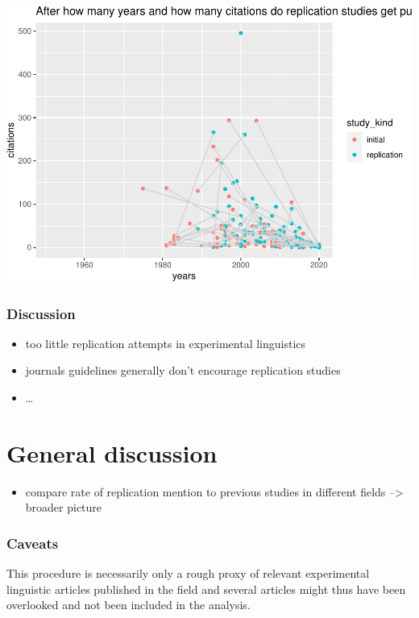 \documentclass[]{elsarticle} %
\providecommand{\tightlist}{%
  \setlength{\itemsep}{0pt}\setlength{\parskip}{0pt}}
\begin{document}
\includegraphics{ReplicationLing_files/figure-latex/plot cit and years all-1.pdf}

\hypertarget{discussion}{%
\subsubsection{Discussion}\label{discussion}}

\begin{itemize}
\tightlist
\item
  too little replication attempts in experimental linguistics
\item
  journals guidelines generally don't encourage replication studies
\item
  \ldots{}
\end{itemize}

\hypertarget{general-discussion}{%
\section{General discussion}\label{general-discussion}}

\begin{itemize}
\tightlist
\item
  compare rate of replication mention to previous studies in different
  fields --\textgreater{} broader picture
\end{itemize}

\hypertarget{caveats}{%
\subsubsection{Caveats}\label{caveats}}

This procedure is necessarily only a rough proxy of relevant
experimental linguistic articles published in the field and several
articles might thus have been overlooked and not been included in the
analysis.
\end{document}
